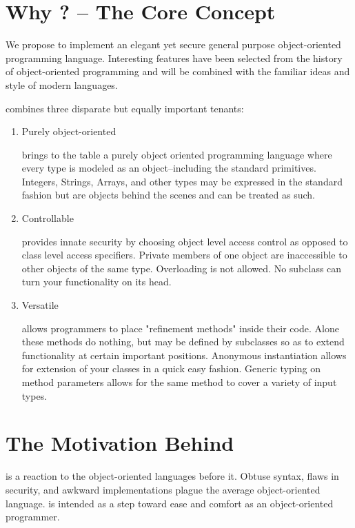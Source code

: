 \section*{Why \Lang{}? -- The Core Concept}
We propose to implement an elegant yet secure general purpose object-oriented programming language. Interesting features have been selected from the history of object-oriented programming and will be combined with the familiar ideas and style of modern languages.

\Lang{} combines three disparate but equally important tenants:


\begin{enumerate}
\item{Purely object-oriented 
    
    \Lang{} brings to the table a purely object oriented programming language where every type is
    modeled as an object--including the standard primitives. Integers, Strings, Arrays, and other types may be expressed in the standard fashion but are objects behind the scenes and can be treated as such.}

\item{Controllable

   \Lang{} provides innate security by choosing object level access
   control as opposed to class level access specifiers. Private members of one object
   are inaccessible to other objects of the same type. Overloading is not allowed.
   No subclass can turn your functionality on its head.}

\item{Versatile

    \Lang{} allows programmers to place "refinement methods" inside their code.
    Alone these methods do nothing, but may be defined by subclasses so as to extend
    functionality at certain important positions. Anonymous instantiation allows for
    extension of your classes in a quick easy fashion. Generic typing on method
    parameters allows for the same method to cover a variety of input types.}
\end{enumerate}

\section*{ The Motivation Behind \Lang{}}
\Lang{} is a reaction to the object-oriented languages before it.
Obtuse syntax, flaws in security, and awkward implementations plague
the average object-oriented language. \Lang{} is intended as a step
toward ease and comfort as an object-oriented programmer.


